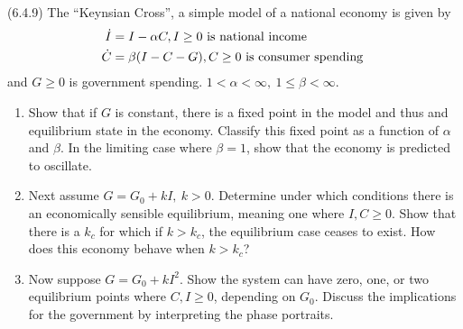 \documentclass[11pt,answers]{exam}
\begin{document}
\begin{questions}
\item (6.4.9) The ``Keynsian Cross'', a simple model of a national economy is given by
\begin{align*}
\dot{I} &= I - \alpha C, I \geq 0 \hbox{ is national income } \\
\dot{C} &= \beta( I - C - G ), C \geq 0 \hbox{ is consumer spending }
\end{align*}
and $G \geq 0$ is government spending.  $1 < \alpha < \infty, ~ 1 \leq \beta < \infty$.
\begin{enumerate}
\item Show that if $G$ is constant, there is a fixed point in the model and thus and equilibrium state in the economy.  Classify this fixed point as a function of $\alpha$ and $\beta$.  In the limiting case where $\beta = 1$, show that the economy is predicted to oscillate.
\item Next assume $G = G_0 + kI, ~ k > 0$.  Determine under which conditions there is an economically sensible equilibrium, meaning one where $I, C \geq 0$.  Show that there is a $k_c$ for which if $k > k_c$, the equilibrium case ceases to exist.  How does this economy behave when $k > k_c$?
\item Now suppose $G = G_0 + kI^2$.  Show the system can have zero, one, or two equilibrium points where $C, I \geq 0$, depending on $G_0$.  Discuss the implications for the government by interpreting the phase portraits.
\end{enumerate}


\end{questions}
\end{document}
